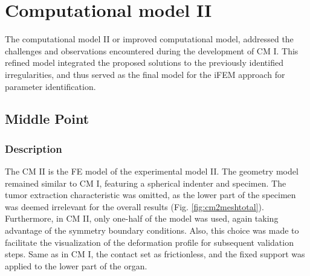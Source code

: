 \section{Computational model II}
\label{section:cmII}
The computational model II or improved computational model, addressed the challenges and observations 
encountered during the development of CM I. This refined model integrated the proposed
solutions to the previously identified irregularities, and thus served as the final model for the 
iFEM approach for parameter identification. 

\subsection{Middle Point}
\label{subsection:mpcmII}
\subsubsection*{Description}
The CM II is the FE model of the experimental model II. The geometry model remained similar to CM I,
featuring a spherical indenter and specimen. The tumor extraction characteristic was omitted, as the 
lower part of the specimen was deemed irrelevant for the overall results (Fig. \ref{fig:cm2meshtotal}). Furthermore, in CM II, only 
one-half of the model was used, again taking advantage of the symmetry boundary conditions. Also,
this choice was made to facilitate the visualization of the deformation profile for subsequent validation 
steps. Same as in CM I, the contact set as frictionless, and the fixed support was applied to the lower part of the organ.\\

